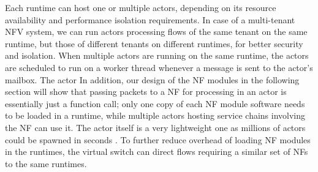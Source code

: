 Each runtime can host one or multiple actors, depending on its resource availability and performance isolation requirements. In case of a multi-tenant NFV system, we can run actors processing flows of the same tenant on the same runtime, but those of different tenants on different runtimes, for better security and isolation. When multiple actors are running on the same runtime, the actors are scheduled to run on a worker thread whenever a message is sent to the actor's mailbox. The actor %
In addition, our design of the NF modules in the following section will show that passing packets to a NF for processing in an actor is essentially just a function call; only one copy of each NF module software needs to be loaded in a runtime, while multiple actors hosting service chains involving the NF can use it. The actor itself is a very lightweight one as millions of actors could be spawned in seconds \cite{chs-rapc-16}. %
To further reduce overhead of loading NF modules in the runtimes, the virtual switch can direct flows requiring a similar set of NFs to the same runtimes.






